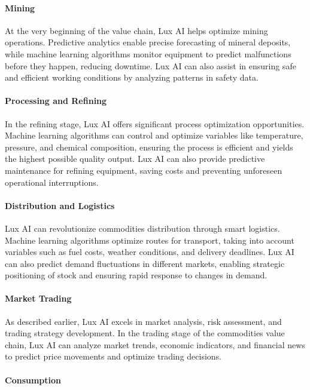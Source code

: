 \documentclass[11pt]{article}
\begin{document}
\paragraph{Mining}

At the very beginning of the value chain, Lux AI helps optimize mining operations. Predictive analytics enable precise forecasting of mineral deposits, while machine learning algorithms monitor equipment to predict malfunctions before they happen, reducing downtime. Lux AI can also assist in ensuring safe and efficient working conditions by analyzing patterns in safety data.


\paragraph{Processing and Refining}

In the refining stage, Lux AI offers significant process optimization opportunities. Machine learning algorithms can control and optimize variables like temperature, pressure, and chemical composition, ensuring the process is efficient and yields the highest possible quality output. Lux AI can also provide predictive maintenance for refining equipment, saving costs and preventing unforeseen operational interruptions.


\paragraph{Distribution and Logistics}

Lux AI can revolutionize commodities distribution through smart logistics. Machine learning algorithms optimize routes for transport, taking into account variables such as fuel costs, weather conditions, and delivery deadlines. Lux AI can also predict demand fluctuations in different markets, enabling strategic positioning of stock and ensuring rapid response to changes in demand.


\paragraph{Market Trading}

As described earlier, Lux AI excels in market analysis, risk assessment, and trading strategy development. In the trading stage of the commodities value chain, Lux AI can analyze market trends, economic indicators, and financial news to predict price movements and optimize trading decisions.


\paragraph{Consumption}
\end{document}
